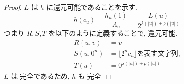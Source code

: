 \begin{proof}
 $L$ は $h$ に還元可能であることを示す.
 \begin{equation}
  h(c_u) = \frac{h_u(1)}{\Lambda_u} 
   = \frac{L(u)}{2^{\lambda(|u|)+\rho(|u|)}}
 \end{equation}
 つまり $R,S,T$ を以下のように定義することで, 還元可能.
 \begin{align}
  R(u,v) &= v \\
  S(u, 0^n) &= \lfloor 2^nc_u \rfloor \text{を表す文字列,} \\
  T(u) &= 0^{\lambda(|u|)+\rho(|u|)}
 \end{align}
 $L$ は \PSPACE 完全であるため, $h$ も \PSPACE 完全.

\end{proof}



